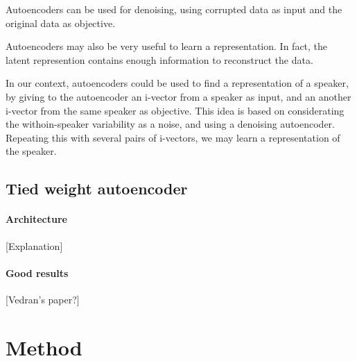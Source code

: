 \documentclass[conference]{IEEEtran}
\begin{document}
Autoencoders can be used for denoising, using corrupted data as input and the original data as objective.

Autoencoders may also be very useful to learn a representation. In fact, the latent represention contains enough information to reconstruct the data.

In our context, autoencoders could be used to find a representation of a speaker, by giving to the autoencoder an i-vector from a speaker as input, and an another i-vector from the same speaker as objective. This idea is based on considerating the withoin-speaker variability as a noise, and using a denoising autoencoder. Repeating this with several pairs of i-vectors, we may learn a representation of the speaker. 



\subsection{Tied weight autoencoder}

\paragraph{Architecture}
[Explanation]

\paragraph{Good results}
[Vedran's paper?]

\section{Method}
\end{document}
